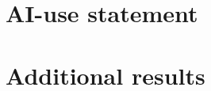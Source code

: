 \documentclass[11pt,a4paper]{article}
\newif\ifshowguide
\theoremstyle{plain}
\theoremstyle{definition}
\theoremstyle{remark}
\newcommand{\guide}[1]{\ifshowguide\par\smallskip\noindent
  \colorbox{gray!12}{\parbox{\dimexpr\linewidth-2\fboxsep}{\small\itshape
  \textbf{Guidance.} #1}}\par\smallskip\fi}
\begin{document}
\section{AI-use statement}

\guide{Required. Which AI tools you used and for what: code, language
editing, finding literature. Every member must be able to explain every
equation and every line of the core code. If you used none, say so.}

\section{Additional results}

\guide{Optional. Proofs, extra figures and tables that support the main
text. Reviewers are not required to read the appendices, so everything
needed to follow the report belongs in the main body.}
\fi
\end{document}
